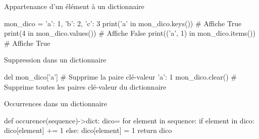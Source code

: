 \begin{easybox}{Appartenance d'un élément à un dictionnaire}{}

	\begin{CodePythontexAlt}[TaillePolice=\normalsize, Largeur=1\linewidth,Centre,PremLigne=1, Lignes=false,]{}
mon_dico = {'a': 1, 'b': 2, 'c': 3}
print('a' in mon_dico.keys())  # Affiche True
print(4 in mon_dico.values())  # Affiche False
print(('a', 1) in mon_dico.items())  # Affiche True
\end{CodePythontexAlt}
\end{easybox}

\begin{easybox}{Suppression dans un dictionnaire}{}

	\begin{CodePythontexAlt}[TaillePolice=\normalsize, Largeur=1\linewidth,Centre,PremLigne=1, Lignes=false,]{}
del mon_dico['a']  # Supprime la paire clé-valeur 'a': 1
mon_dico.clear()  # Supprime toutes les paires clé-valeur du dictionnaire
\end{CodePythontexAlt}
\end{easybox}

\begin{easybox}{Occurrences dans un dictionnaire}{}
\begin{CodePythontexAlt}[TaillePolice=\normalsize, Largeur=1\linewidth,Centre,Lignes=false,PremLigne=1]{}
def occurence(sequence)->dict:
	dico={}
	for element in sequence:
		if element in dico:
			dico[element] += 1
		else:
			dico[element] = 1
	return dico
\end{CodePythontexAlt}
\end{easybox}

